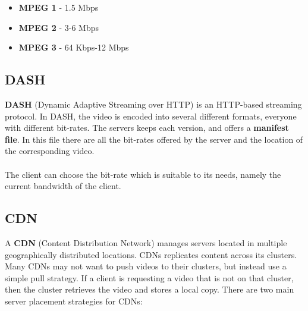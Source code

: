 \documentclass{article}
\begin{document}
\begin{itemize}
	\item \textbf{MPEG 1} - 1.5 Mbps
	\item \textbf{MPEG 2} - 3-6 Mbps
	\item \textbf{MPEG 3} - 64 Kbps-12 Mbps
\end{itemize}

\subsection{DASH}
\textbf{DASH} (Dynamic Adaptive Streaming over HTTP) is an HTTP-based streaming protocol. In DASH, the video is encoded into several different formats, everyone with different bit-rates. The servers keeps each version, and offers a \textbf{manifest file}. In this file there are all the bit-rates offered by the server and the location of the corresponding video. \\ \\
The client can choose the bit-rate which is suitable to its needs, namely the current bandwidth of the client.

\subsection{CDN}
A \textbf{CDN} (Content Distribution Network) manages servers located in multiple geographically distributed locations. CDNs replicates content across its clusters. Many CDNs may not want to push videos to their clusters, but instead use a simple pull strategy. If a client is requesting a video that is not on that cluster, then the cluster retrieves the video and stores a local copy. There are two main server placement strategies for CDNs:
\end{document}
